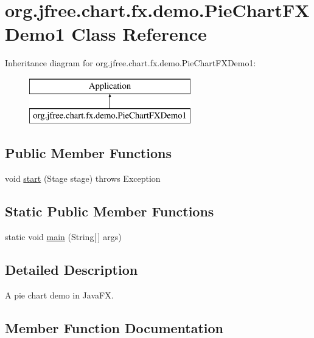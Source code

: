 \hypertarget{classorg_1_1jfree_1_1chart_1_1fx_1_1demo_1_1_pie_chart_f_x_demo1}{}\section{org.\+jfree.\+chart.\+fx.\+demo.\+Pie\+Chart\+F\+X\+Demo1 Class Reference}
\label{classorg_1_1jfree_1_1chart_1_1fx_1_1demo_1_1_pie_chart_f_x_demo1}
Inheritance diagram for org.\+jfree.\+chart.\+fx.\+demo.\+Pie\+Chart\+F\+X\+Demo1\+:\begin{figure}[H]
\begin{center}
\leavevmode
\includegraphics[height=2.000000cm]{classorg_1_1jfree_1_1chart_1_1fx_1_1demo_1_1_pie_chart_f_x_demo1}
\end{center}
\end{figure}
\subsection*{Public Member Functions}
\begin{DoxyCompactItemize}
\item 
void \mbox{\hyperlink{classorg_1_1jfree_1_1chart_1_1fx_1_1demo_1_1_pie_chart_f_x_demo1_aff578d100b17f68324c4c61654f0a9d5}{start}} (Stage stage)  throws Exception 
\end{DoxyCompactItemize}
\subsection*{Static Public Member Functions}
\begin{DoxyCompactItemize}
\item 
static void \mbox{\hyperlink{classorg_1_1jfree_1_1chart_1_1fx_1_1demo_1_1_pie_chart_f_x_demo1_af31a5fd75a449d2b8937d80725c03f68}{main}} (String\mbox{[}$\,$\mbox{]} args)
\end{DoxyCompactItemize}


\subsection{Detailed Description}
A pie chart demo in Java\+FX. 

\subsection{Member Function Documentation}
\mbox{\label{classorg_1_1jfree_1_1chart_1_1fx_1_1demo_1_1_pie_chart_f_x_demo1_af31a5fd75a449d2b8937d80725c03f68}} 
